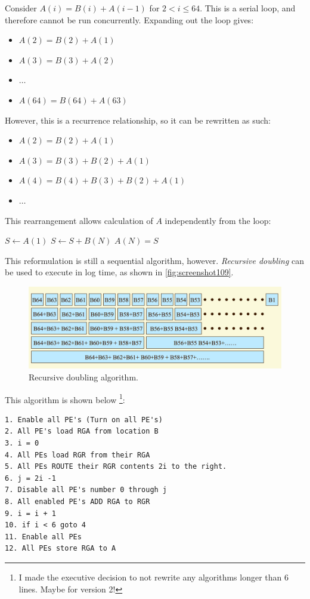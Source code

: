 Consider $A(i) = B(i) + A(i-1)$ for $2 < i \le 64$. This is a serial loop, and therefore cannot be run concurrently. Expanding out the loop gives: \begin{itemize}
\item $A(2) = B(2) + A(1)$
\item $A(3) = B(3) + A(2)$
\item $\dots$
\item $A(64) = B(64) + A(63)$
\end{itemize}
However, this is a recurrence relationship, so it can be rewritten as such:
\begin{itemize}
\item $A(2) = B(2) + A(1)$
\item $A(3) = B(3) + B(2) + A(1)$
\item $A(4) = B(4) + B(3) + B(2) + A(1)$
\item $\dots$
\end{itemize}
This rearrangement allows calculation of $A$ independently from the loop:
\begin{algorithmic}
\State $S \gets A(1)$
	\State $S \gets S + B(N)$
\EndFor
\State $A(N) = S$
\end{algorithmic}
This reformulation is still a sequential algorithm, however. \textit{Recursive doubling} can be used to execute in log time, as shown in \autoref{fig:screenshot109}.

\begin{figure}
\centering
\includegraphics[width=0.7\linewidth]{figures/screenshot109}
\caption{Recursive doubling algorithm.}
\label{fig:screenshot109}
\end{figure}

This algorithm is shown below \footnote{I made the executive decision to not rewrite any algorithms longer than 6 lines. Maybe for version 2!}:
\begin{lstlisting}[language={}]
1. Enable all PE's (Turn on all PE's) 
2. All PE's load RGA from location B 
3. i = 0 
4. All PEs load RGR from their RGA 
5. All PEs ROUTE their RGR contents 2i to the right. 
6. j = 2i -1 
7. Disable all PE's number 0 through j 
8. All enabled PE's ADD RGA to RGR 
9. i = i + 1 
10. if i < 6 goto 4 
11. Enable all PEs 
12. All PEs store RGA to A 
\end{lstlisting}
